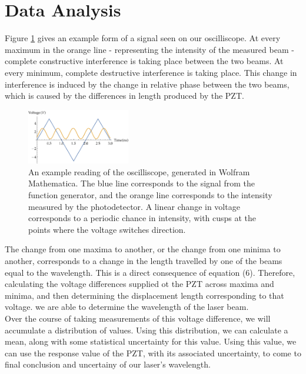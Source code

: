  \section{Data Analysis}
    Figure \ref{fig:waveform} gives an example form of a signal seen on our oscilliscope. At every maximum in the orange line - representing the intensity of the measured beam - complete constructive interference is taking place between the two beams. At every minimum, complete destructive interference is taking place. This change in interference is induced by the change in relative phase between the two beams, which is caused by the differences in length produced by the PZT.
   \begin{figure}[t]
    \includegraphics[width=0.4\textwidth]{waveform.pdf}
    \caption{An example reading of the oscilliscope, generated in Wolfram Mathematica. The blue line corresponds to the signal from the function generator, and the orange line corresponds to the intensity measured by the photodetector. A linear change in voltage corresponds to a periodic chance in intensity, with cusps at the points where the voltage switches direction.}
    \label{fig:waveform}
    \end{figure}
    The change from one maxima to another, or the change from one minima to another, corresponds to a change in the length travelled by one of the beams equal to the wavelength. This is a direct consequence of equation (6). Therefore, calculating the voltage differences supplied ot the PZT across maxima and minima, and then determining the displacement length corresponding to that voltage. we are able to determine the wavelength of the laser beam.
    \\
    Over the course of taking measurements of this voltage difference, we will accumulate a distribution of values. Using this distribution, we can calculate a mean, along with some statistical uncertainty for this value. Using this value, we can use the response value of the PZT, with its associated uncertainty, to come to final conclusion and uncertainy of our laser's wavelength.
